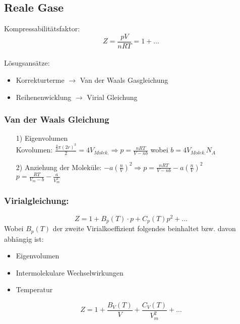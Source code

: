 \documentclass[a4paper]{article}
\begin{document}
\subsection{Reale Gase}
Kompressabilitätsfaktor:
\begin{equation*}
    Z=\frac{pV}{nRT}=1+\dots
\end{equation*}\\
Lösugsansätze:
\begin{itemize}
    \item Korrekturterme $\rightarrow$ Van der Waals Gasgleichung
    \item Reihenenwicklung $\rightarrow$ Virial Gleichung
\end{itemize}
\subsubsection{Van der Waals Gleichung}
\begin{itemize}
    \item[1)] Eigenvolumen\\ Kovolumen: $\frac{\frac{4}{3}\pi\left(2r\right)^3}{2}=4V_{Molek.} \Rightarrow p=\frac{nRT}{V-nb}$ wobei $b=4V_{Molek.}N_A$
    \item[2)] Anziehung der Moleküle: $-a\left(\frac{n}{V}\right)^2 \Rightarrow p=\frac{nRT}{V-nb}-a\left(\frac{n}{V}\right)^2$\\$p=\frac{RT}{V_m-b}-\frac{a}{V_m^2}$
\end{itemize}
\subsubsection{Virialgleichung:}
\begin{equation*}
    Z = 1 + B_p(T)\cdot p + C_p(T)p^2 + \dots
\end{equation*}
Wobei $B_p(T)$ der zweite Virialkoeffizient folgendes beinhaltet bzw. davon abhängig ist:
\begin{itemize}
    \item Eigenvolumen
    \item Intermolekulare Wechselwirkungen
    \item Temperatur
\end{itemize}
\vspace*{1cm}
\begin{equation*}
    Z = 1 + \frac{B_V(T)}{V} + \frac{C_V(T)}{V_m^2} + \dots
\end{equation*}
\end{document}
